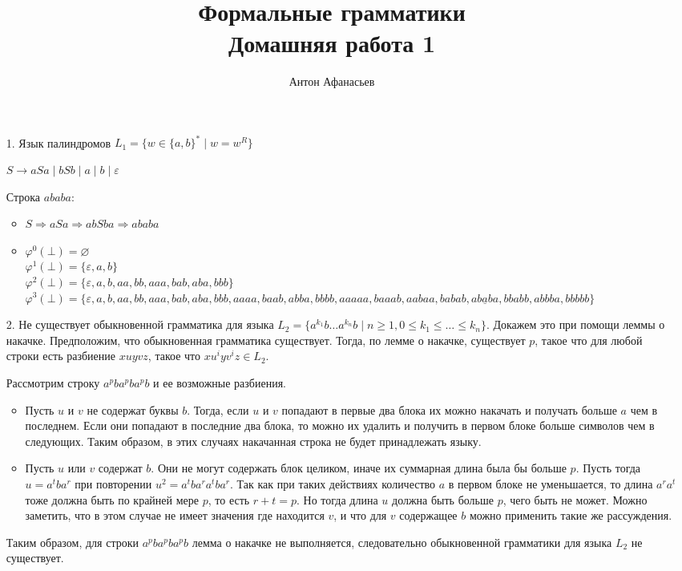 \documentclass[10pt]{article}
\newcommand{\eps}{\varepsilon}
\newcommand{\dto}{\Rightarrow}
\begin{document}
\title{Формальные грамматики \\ Домашняя работа 1}
\author{Антон Афанасьев}
\maketitle
\begin{enumerate}
	\item[1.] Язык палиндромов $L_1 = \{ w \in \{a, b\}^* \mid w = w^R\}$
		
		$S \to aSa \mid bSb \mid a \mid b \mid \eps$
		
		Строка $ababa$:
		\begin{itemize}
			\item $S \dto aSa \dto abSba \dto ababa$
			\item 
				$\varphi^0(\bot) = \varnothing$ \\
				$\varphi^1(\bot) = \{\eps, a, b\}$ \\
				$\varphi^2(\bot) = \{\eps, a, b, aa, bb, aaa, bab, aba, bbb\}$ \\ 
				$\varphi^3(\bot) = \{\eps, a, b, aa, bb, aaa, bab, aba, bbb, aaaa, baab, abba, bbbb, aaaaa, baaab, aabaa, babab, \underline{ababa}, bbabb, abbba, bbbbb\}$
		\end{itemize}
		
	\item[2.] Не существует обыкновенной грамматика для языка $L_2=\{ a^{k_1} b \ldots a^{k_n} b \mid n \geqslant 1, 0 \leqslant k_1 \leqslant \ldots \leqslant k_n \}$. Докажем это при помощи леммы о накачке. Предположим, что обыкновенная грамматика существует. Тогда, по лемме о накачке, существует $p$, такое что для любой строки есть разбиение $xuyvz$, такое что $xu^iyv^iz \in L_2$. 
	
	Рассмотрим строку $a^p b a^p b a^p b$ и ее возможные разбиения.
	\begin{itemize}
		\item Пусть $u$ и $v$ не содержат буквы $b$. Тогда, если $u$ и $v$ попадают в первые два блока их можно накачать и получать больше $a$ чем в последнем. Если они попадают в последние два блока, то можно их удалить и получить в первом блоке больше символов чем в следующих. Таким образом, в этих случаях накачанная строка не будет принадлежать языку.
		\item Пусть $u$ или $v$ содержат $b$. Они не могут содержать блок целиком, иначе их суммарная длина была бы больше $p$. Пусть тогда $u = a^t b a^r$ при повторении $u^2 = a^t b a^r a^t b a^r$. Так как при таких действиях количество $a$ в первом блоке не уменьшается, то длина $a^ra^t$ тоже должна быть по крайней мере $p$, то есть $r+t = p$. Но тогда длина $u$ должна быть больше $p$, чего быть не может. Можно заметить, что в этом случае не имеет значения где находится $v$, и что для $v$ содержащее $b$ можно применить такие же рассуждения.
	\end{itemize}
	Таким образом, для строки $a^p b a^p b a^p b$ лемма о накачке не выполняется, следовательно обыкновенной грамматики для языка $L_2$ не существует.
	

\end{enumerate}
\end{document}
